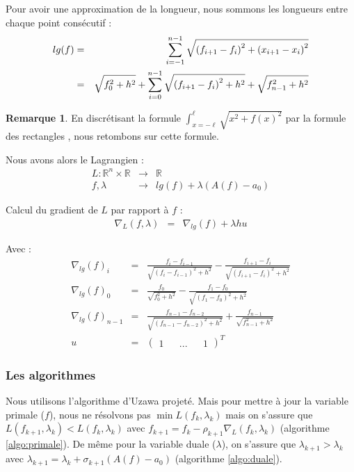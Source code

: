 \documentclass[10pt,a4paper]{article}
\newcommand{\R}{\mathbb{R}}
\theoremstyle{plain}
\theoremstyle{definition}
\newtheorem{rem}[thm]{Remarque}
\begin{document}
Pour avoir une approximation de la longueur, nous sommons les longueurs entre chaque point consécutif :
\begin{eqnarray*}
lg(f) &=& \sum_{i=-1}^{n-1}{\sqrt{\vphantom{f_n^2}{(f_{i+1}-f_i)}^2+{(x_{i+1}-x_i)}^2}}\\
&=& \sqrt{f_0^2+h^2} + \sum_{i=0}^{n-1}{\sqrt{\vphantom{f_n^2}{(f_{i+1}-f_i)}^2+h^2}} + \sqrt{f_{n-1}^2+h^2} 
\end{eqnarray*}

\begin{rem}
En discrétisant la formule $\int_{x=-\ell}^{\ell}{\sqrt{x^2+f(x)^2}}$ par la formule des rectangles , nous retombons sur cette formule.
\end{rem}

Nous avons alors le Lagrangien :
\begin{eqnarray*}
L \colon \R^n \times \R &\rightarrow & \R \\
f, \lambda &\rightarrow & lg(f) + \lambda (A(f)-a_0)
\end{eqnarray*}

Calcul du gradient de $L$ par rapport à $f$ :
\begin{eqnarray*}
\nabla_L(f, \lambda) & = & \nabla_{lg}(f) + \lambda h u
\end{eqnarray*}

Avec :
\begin{eqnarray*}
\nabla_{lg}(f)_i &=& \frac{f_i-f_{i-1}}{\sqrt{(f_i-f_{i-1})^2+h^2}} - \frac{f_{i+1}-f_i}{\sqrt{(f_{i+1}-f_i)^2+h^2}} \\
\nabla_{lg}(f)_0 &=& \frac{f_0}{\sqrt{f_0^2+h^2}} - \frac{f_{1}-f_0}{\sqrt{(f_{1}-f_0)^2+h^2}} \\
\nabla_{lg}(f)_{n-1} &=& \frac{f_{n-1}-f_{n-2}}{\sqrt{(f_{n-1}-f_{n-2})^2+h^2}} + \frac{f_{n-1}}{\sqrt{f_{n-1}^2+h^2}} \\
u &=& (\begin{matrix} 1 && ... && 1 \end{matrix})^T
\end{eqnarray*}

\subsubsection{Les algorithmes}

Nous utilisons l'algorithme d'Uzawa projeté. Mais pour mettre à jour la variable primale ($f$), nous ne résolvons pas $\min L(f_k,\lambda_k)$ mais on s'assure que $L(f_{k+1},\lambda_k) < L(f_k,\lambda_k)$ avec $f_{k+1} = f_k - \rho_{k+1} \nabla_L(f_k,\lambda_k)$ (algorithme \ref{algo:primale}). De même pour la variable duale ($\lambda$), on s'assure que $\lambda_{k+1} > \lambda_k$ avec $\lambda_{k+1} = \lambda_k + \sigma_{k+1} (A(f)-a_0)$ (algorithme \ref{algo:duale}).
\end{document}
